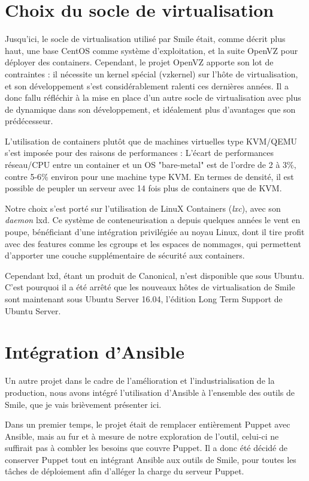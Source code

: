 \documentclass[14 pt,a4paper]{extreport}
\begin{document}
\section{Choix du socle de virtualisation}

Jusqu'ici, le socle de virtualisation utilisé par Smile était, comme décrit plus haut, une base CentOS comme système d'exploitation, et la suite OpenVZ pour déployer des containers. Cependant, le projet OpenVZ apporte son lot de contraintes : il nécessite un kernel spécial (vzkernel) sur l'hôte de virtualisation, et son développement s'est considérablement ralenti ces dernières années. Il a donc fallu réfléchir à la mise en place d'un autre socle de virtualisation avec plus de dynamique dans son développement, et idéalement plus d'avantages que son prédécesseur.

L'utilisation de containers plutôt que de machines virtuelles type KVM/QEMU s'est imposée pour des raisons de performances : L'écart de performances réseau/CPU entre un container et un OS "bare-metal" est de l'ordre de 2 à 3\%, contre 5-6\% environ pour une machine type KVM. En termes de densité, il est possible de peupler un serveur avec 14 fois plus de containers que de KVM.

Notre choix s'est porté sur l'utilisation de LinuX Containers (\emph{lxc}), avec son \emph{daemon} lxd. Ce système de conteneurisation a depuis quelques années le vent en poupe, bénéficiant d'une intégration privilégiée au noyau Linux, dont il tire profit avec des features comme les cgroups et les espaces de nommages, qui permettent d'apporter une couche supplémentaire de sécurité aux containers. 

Cependant lxd, étant un produit de Canonical, n'est disponible que sous Ubuntu. C'est pourquoi il a été arrêté que les nouveaux hôtes de virtualisation de Smile sont maintenant sous Ubuntu Server 16.04, l'édition Long Term Support de Ubuntu Server.

\section{Intégration d'Ansible}

Un autre projet dans le cadre de l'amélioration et l'industrialisation de la production, nous avons intégré l'utilisation d'Ansible à l'ensemble des outils de Smile, que je vais brièvement présenter ici.

Dans un premier temps, le projet était de remplacer entièrement Puppet avec Ansible, mais au fur et à mesure de notre exploration de l'outil, celui-ci ne suffirait pas à combler les besoins que couvre Puppet. Il a donc été décidé de conserver Puppet tout en intégrant Ansible aux outils de Smile, pour toutes les tâches de déploiement afin d'alléger la charge du serveur Puppet.
\end{document}

